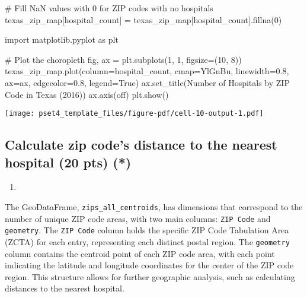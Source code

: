 \documentclass[
  letterpaper,
  DIV=11,
  numbers=noendperiod]{scrartcl}
\newenvironment{Shaded}{\begin{snugshade}}{\end{snugshade}}
\newcommand{\CommentTok}[1]{\textcolor[rgb]{0.37,0.37,0.37}{#1}}
\newcommand{\DecValTok}[1]{\textcolor[rgb]{0.68,0.00,0.00}{#1}}
\newcommand{\FloatTok}[1]{\textcolor[rgb]{0.68,0.00,0.00}{#1}}
\newcommand{\ImportTok}[1]{\textcolor[rgb]{0.00,0.46,0.62}{#1}}
\newcommand{\NormalTok}[1]{\textcolor[rgb]{0.00,0.23,0.31}{#1}}
\newcommand{\OperatorTok}[1]{\textcolor[rgb]{0.37,0.37,0.37}{#1}}
\newcommand{\StringTok}[1]{\textcolor[rgb]{0.13,0.47,0.30}{#1}}
\newcommand{\VariableTok}[1]{\textcolor[rgb]{0.07,0.07,0.07}{#1}}
\providecommand{\tightlist}{%
  \setlength{\itemsep}{0pt}\setlength{\parskip}{0pt}}\usepackage{longtable,booktabs,array}
\begin{document}
\begin{Shaded}
\begin{Highlighting}[]
\CommentTok{\# Fill NaN values with 0 for ZIP codes with no hospitals}
\NormalTok{texas\_zip\_map[}\StringTok{\textquotesingle{}hospital\_count\textquotesingle{}}\NormalTok{] }\OperatorTok{=}\NormalTok{ texas\_zip\_map[}\StringTok{\textquotesingle{}hospital\_count\textquotesingle{}}\NormalTok{].fillna(}\DecValTok{0}\NormalTok{)}

\ImportTok{import}\NormalTok{ matplotlib.pyplot }\ImportTok{as}\NormalTok{ plt}

\CommentTok{\# Plot the choropleth}
\NormalTok{fig, ax }\OperatorTok{=}\NormalTok{ plt.subplots(}\DecValTok{1}\NormalTok{, }\DecValTok{1}\NormalTok{, figsize}\OperatorTok{=}\NormalTok{(}\DecValTok{10}\NormalTok{, }\DecValTok{8}\NormalTok{))}
\NormalTok{texas\_zip\_map.plot(column}\OperatorTok{=}\StringTok{\textquotesingle{}hospital\_count\textquotesingle{}}\NormalTok{, cmap}\OperatorTok{=}\StringTok{\textquotesingle{}YlGnBu\textquotesingle{}}\NormalTok{, linewidth}\OperatorTok{=}\FloatTok{0.8}\NormalTok{, ax}\OperatorTok{=}\NormalTok{ax, edgecolor}\OperatorTok{=}\StringTok{\textquotesingle{}0.8\textquotesingle{}}\NormalTok{, legend}\OperatorTok{=}\VariableTok{True}\NormalTok{)}
\NormalTok{ax.set\_title(}\StringTok{\textquotesingle{}Number of Hospitals by ZIP Code in Texas (2016)\textquotesingle{}}\NormalTok{)}
\NormalTok{ax.axis(}\StringTok{\textquotesingle{}off\textquotesingle{}}\NormalTok{)}
\NormalTok{plt.show()}
\end{Highlighting}
\end{Shaded}

\texttt{[image: pset4\_template\_files/figure-pdf/cell-10-output-1.pdf]}

\subsection{Calculate zip code's distance to the nearest hospital (20
pts)
(*)}\label{calculate-zip-codes-distance-to-the-nearest-hospital-20-pts}

\begin{enumerate}
\def\labelenumi{\arabic{enumi}.}
\tightlist
\item
\end{enumerate}

The GeoDataFrame, \texttt{zips\_all\_centroids}, has dimensions that
correspond to the number of unique ZIP code areas, with two main
columns: \texttt{ZIP\ Code} and \texttt{geometry}. The
\texttt{ZIP\ Code} column holds the specific ZIP Code Tabulation Area
(ZCTA) for each entry, representing each distinct postal region. The
\texttt{geometry} column contains the centroid point of each ZIP code
area, with each point indicating the latitude and longitude coordinates
for the center of the ZIP code region. This structure allows for further
geographic analysis, such as calculating distances to the nearest
hospital.
\end{document}
